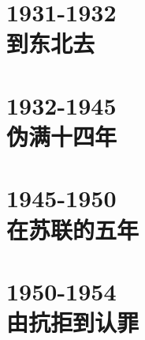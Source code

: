 \documentclass[oneside,openright,headings=optiontohead]{scrbook}
\begin{document}
{\part{1931-1932\\\hspace{1cm}到东北去}
\begin{multicols}{2}







\end{multicols}
\part{1932-1945\\\hspace{1cm}伪满十四年}
\begin{multicols}{2}










\end{multicols}
\part{1945-1950\\\hspace{1cm}在苏联的五年}
\begin{multicols}{2}



\end{multicols}
\part{1950-1954\\\hspace{1cm}由抗拒到认罪}
\begin{multicols}{2}











\end{multicols}
}
\end{document}
